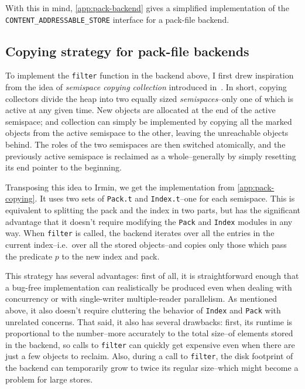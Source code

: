 

With this in mind, \cref{app:pack-backend} gives a simplified implementation of the \texttt{CONTENT\_ADDRESSABLE\_STORE} interface for a pack-file backend.

\subsection{Copying strategy for pack-file backends}

To implement the \texttt{filter} function in the backend above, I first drew inspiration from the idea of \emph{semispace copying collection} introduced in~\cite{feni69}. In short, copying collectors divide the heap into two equally sized \emph{semispaces}--only one of which is active at any given time. New objects are allocated at the end of the active semispace; and collection can simply be implemented by copying all the marked objects from the active semispace to the other, leaving the unreachable objects behind. The roles of the two semispaces are then switched atomically, and the previously active semispace is reclaimed as a whole--generally by simply resetting its end pointer to the beginning.

Transposing this idea to Irmin, we get the implementation from \cref{app:pack-copying}. It uses two sets of \texttt{Pack.t} and \texttt{Index.t}--one for each semispace. This is equivalent to splitting the pack and the index in two parts, but has the significant advantage that it doesn't require modifying the \texttt{Pack} and \texttt{Index} modules in any way. When \texttt{filter} is called, the backend iterates over all the entries in the current index--i.e.~over all the stored objects--and copies only those which pass the predicate \(p\) to the new index and pack.

This strategy has several advantages: first of all, it is straightforward enough that a bug-free implementation can realistically be produced even when dealing with concurrency or with single-writer multiple-reader parallelism. As mentioned above, it also doesn't require cluttering the behavior of \texttt{Index} and \texttt{Pack} with unrelated concerns. That said, it also has several drawbacks: first, its runtime is proportional to the number--more accurately to the total size--of elements stored in the backend, so calls to \texttt{filter} can quickly get expensive even when there are just a few objects to reclaim. Also, during a call to \texttt{filter}, the disk footprint of the backend can temporarily grow to twice its regular size--which might become a problem for large stores.

